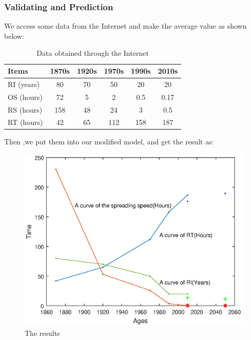 \subsubsection*{Validating and Prediction}
	\par We access some data from the Internet and make the average value as shown below:
\begin{table}[tbp]
	 \centering%
	\begin{tabular}{lccccc}  %
		\hline
		Items & 1870s & 1920s & 1970s & 1990s & 2010s\\ \hline  %
		RI (years) & 80 & 70  & 50  & 20 & 20 \\         %
		OS (hours)& 72 & 5 & 2 & 0.5 & 0.17\\        %
		RS (hours) & 158 & 48 & 24 & 3 & 0.5\\ 
		RT (hours) & 42 & 65 & 112 & 158 & 187  \\
		\hline
	\end{tabular}
	\caption{Data obtained through the Internet}\label{tab:1}
\end{table} 
\par Then ,we put them into our modified model, and get the result as:
\begin{figure}[h]
	\small
	\centering
	\includegraphics[width=15cm]{./picture/wtf.eps}
	\caption{The results}
	\label{fig:The results}
\end{figure}

